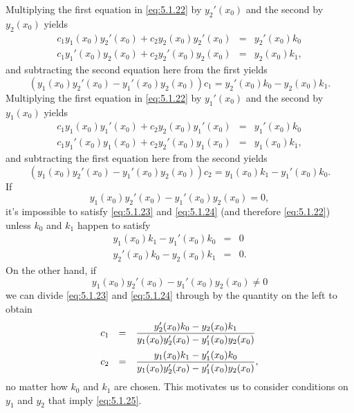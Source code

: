 Multiplying the first equation in \eqref{eq:5.1.22} by $y_{2}'(x_{0})$ and the second by
$y_{2}(x_{0})$ yields
\begin{eqnarray*}
  c_{1}y_{1}(x_{0})y_{2}'(x_{0})+c_{2}y_{2}(x_{0})y_{2}'(x_{0}) & = & y_{2}'(x_{0})k_{0} \\
  c_{1}y_{1}'(x_{0})y_{2}(x_{0})+c_{2}y_{2}'(x_{0})y_{2}(x_{0}) & = & y_{2}(x_{0})k_{1},
\end{eqnarray*}
and subtracting the second equation here from the first yields
\begin{equation}
  \label{eq:5.1.23}\left(y_{1}(x_{0})y_{2}'(x_{0})-y_{1}'(x_{0})y_{2}(x_{0})\right)c_{1}= y_{2}'(x_{0})k_{0}-y_{2}(x_{0})k_{1}.
\end{equation}
Multiplying the first equation in \eqref{eq:5.1.22} by $y_{1}'(x_{0})$ and the second by
$y_{1}(x_{0})$ yields
\begin{eqnarray*}
  c_{1}y_{1}(x_{0})y_{1}'(x_{0})+c_{2}y_{2}(x_{0})y_{1}'(x_{0}) & = & y_{1}'(x_{0})k_{0} \\
  c_{1}y_{1}'(x_{0})y_{1}(x_{0})+c_{2}y_{2}'(x_{0})y_{1}(x_{0}) & = & y_{1}(x_{0})k_{1},
\end{eqnarray*}
and subtracting the first equation here from the second yields
\begin{equation}
  \label{eq:5.1.24}\left(y_{1}(x_{0})y_{2}'(x_{0})-y_{1}'(x_{0})y_{2}(x_{0})\right)c_{2}= y_{1}(x_{0})k_{1}-y_{1}'(x_{0})k_{0}.
\end{equation}
If
\[
  y_{1}(x_{0})y_{2}'(x_{0})-y_{1}'(x_{0})y_{2}(x_{0})=0,
\]
it's impossible to satisfy \eqref{eq:5.1.23} and \eqref{eq:5.1.24} (and therefore \eqref{eq:5.1.22})
unless $k_{0}$ and $k_{1}$ happen to satisfy
\begin{eqnarray*}
  y_{1}(x_{0})k_{1}-y_{1}'(x_{0})k_{0} & = & 0 \\
  y_{2}'(x_{0})k_{0}-y_{2}(x_{0})k_{1} & = & 0.
\end{eqnarray*}
On the other hand, if
\begin{equation}
  \label{eq:5.1.25}y_{1}(x_{0})y_{2}'(x_{0})-y_{1}'(x_{0})y_{2}(x_{0})\ne0
\end{equation}
we can divide \eqref{eq:5.1.23} and \eqref{eq:5.1.24} through by the quantity on the left to obtain
\begin{equation}
  \label{eq:5.1.26}
  \begin{array}{rcl}
    c_{1} & = & \displaystyle\frac{y_{2}'(x_{0})k_{0}-y_{2}(x_{0})k_{1}}{y_{1}(x_{0})y_{2}'(x_{0})-y_{1}'(x_{0})y_{2}(x_{0})}  \\[4\jot]
    c_{2} & = & \displaystyle\frac{y_{1}(x_{0})k_{1}-y_{1}'(x_{0})k_{0}}{y_{1}(x_{0})y_{2}'(x_{0})-y_{1}'(x_{0})y_{2}(x_{0})},
  \end{array}
\end{equation}
no matter how $k_{0}$ and $k_{1}$ are chosen. This motivates us to consider conditions on $y_{1}$
and $y_{2}$ that imply \eqref{eq:5.1.25}.

